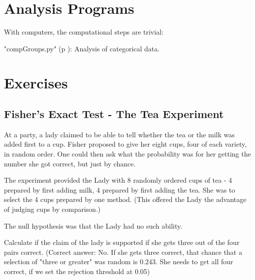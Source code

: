 \section{Analysis Programs}

With computers, the computational steps are trivial:

\PyImg "compGroups.py" (p \pageref{py:compGroups}): Analysis of categorical data.

\section{Exercises}

\subsection{Fisher's Exact Test - The Tea Experiment}

At a party, a lady claimed to be able to tell whether the tea or the milk was added first to a cup. Fisher proposed to give her eight cups, four of each variety, in random order. One could then ask what the probability was for her getting the number she got correct, but just by chance.

The experiment provided the Lady with 8 randomly ordered cups of tea - 4 prepared by first adding milk, 4 prepared by first adding the tea. She was to select the 4 cups prepared by one method. (This offered the Lady the advantage of judging cups by comparison.)

The null hypothesis was that the Lady had no such ability.

Calculate if the claim of the lady is supported if she gets three out of the four pairs correct.
(Correct answer: No. If she gets three correct, that chance that a selection of "three or greater" was random is 0.243. She needs to get all four correct, if we set the rejection threshold at 0.05)

